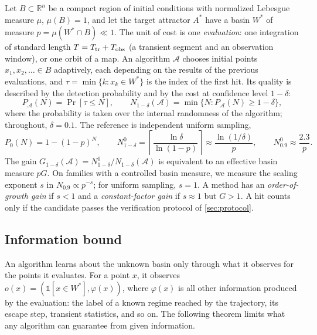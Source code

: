 Let $B\subset\mathbb{R}^n$ be a compact region of initial conditions with normalized Lebesgue measure $\mu$, $\mu(B)=1$, and let the target attractor $A^*$ have a basin $W^*$ of measure $p=\mu(W^*\cap B)\ll1$. The unit of cost is one \emph{evaluation}: one integration of standard length $T=T_{\rm tr}+T_{\rm obs}$ (a transient segment and an observation window), or one orbit of a map. An algorithm $\mathcal{A}$ chooses initial points $x_1,x_2,\dots\in B$ adaptively, each depending on the results of the previous evaluations, and $\tau=\min\{k: x_k\in W^*\}$ is the index of the first hit. Its quality is described by the detection probability and by the cost at confidence level $1-\delta$:
\begin{equation}
P_{\mathcal A}(N)=\Pr[\tau\le N],\qquad N_{1-\delta}(\mathcal A)=\min\{N: P_{\mathcal A}(N)\ge 1-\delta\},
\label{eq:pn}
\end{equation}
where the probability is taken over the internal randomness of the algorithm; throughout, $\delta=0.1$. The reference is independent uniform sampling,
\begin{equation}
P_0(N)=1-(1-p)^N,\qquad N^0_{1-\delta}=\left\lceil\frac{\ln\delta}{\ln(1-p)}\right\rceil\approx\frac{\ln(1/\delta)}{p},\qquad N^0_{0.9}\approx\frac{2.3}{p}.
\label{eq:uniform}
\end{equation}
The gain $G_{1-\delta}(\mathcal A)=N^0_{1-\delta}/N_{1-\delta}(\mathcal A)$ is equivalent to an effective basin measure $pG$. On families with a controlled basin measure, we measure the scaling exponent $s$ in $N_{0.9}\propto p^{-s}$; for uniform sampling, $s=1$. A method has an \emph{order-of-growth gain} if $s<1$ and a \emph{constant-factor gain} if $s\approx1$ but $G>1$. A hit counts only if the candidate passes the verification protocol of \cref{sec:protocol}.

\subsection{Information bound}\label{sec:infobound}

An algorithm learns about the unknown basin only through what it observes for the points it evaluates. For a point $x$, it observes $o(x)=(\mathbb 1[x\in W^*],\varphi(x))$, where $\varphi(x)$ is all other information produced by the evaluation: the label of a known regime reached by the trajectory, its escape step, transient statistics, and so on. The following theorem limits what any algorithm can guarantee from given information.

